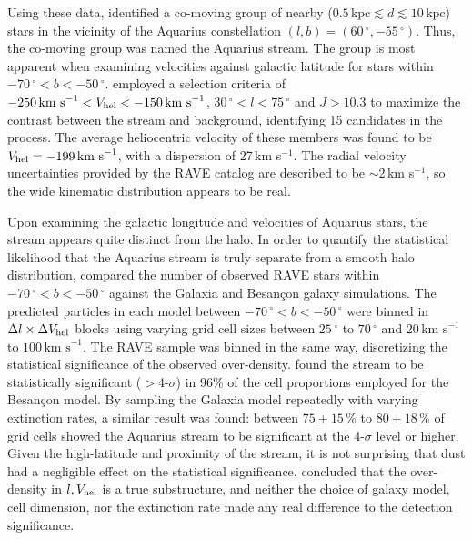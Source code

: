 \documentclass{emulateapj}
\begin{document}
Using these data, \citet{williams;et-al_2011} identified a co-moving group of nearby ($0.5\,\mbox{kpc} \lesssim d \lesssim 10\,\mbox{kpc}$) stars in the vicinity of the Aquarius constellation $(l, b) = (60\,^\circ, -55\,^\circ)$. Thus, the co-moving group was named the Aquarius stream. The group is most apparent when examining velocities against galactic latitude for stars within $-70\,^\circ < b < -50\,^\circ$. \citet{williams;et-al_2011} employed a selection criteria of $-250\,\mbox{km s}^{-1} < V_{\rm hel} < -150\,\mbox{km s}^{-1}$, $30\,^\circ < l < 75\,^\circ$ and $J > 10.3$ to maximize the contrast between the stream and background, identifying 15 candidates in the process. The average heliocentric velocity of these members was found to be $V_{\rm hel} = -199\,\mbox{km s}^{-1}$, with a dispersion of 27\,km s$^{-1}$. The radial velocity uncertainties provided by the RAVE catalog are described to be $\sim$2\,km s$^{-1}$, so the wide kinematic distribution appears to be real.

Upon examining the galactic longitude and velocities of Aquarius stars, the stream appears quite distinct from the halo. In order to quantify the statistical likelihood that the Aquarius stream is truly separate from a smooth halo distribution, \citet{williams;et-al_2011} compared the number of observed RAVE stars within $-70\,^\circ < b < -50\,^\circ$ against the Galaxia \citep{sharma;et-al_2011} and Besan\c{c}on \citep{robin;et-al_2003} galaxy simulations. The predicted particles in each model between $-70\,^\circ < b < -50\,^\circ$ were binned in $\Delta{l} \times \Delta{V_{\rm hel}}$ blocks using varying grid cell sizes between $25\,^\circ$ to $70\,^\circ$ and $20\,\mbox{km s}^{-1}$ to $100\,\mbox{km s}^{-1}$. The RAVE sample was binned in the same way, discretizing the statistical significance of the observed over-density. \citet{williams;et-al_2011} found the stream to be statistically significant ($>$4-$\sigma$) in 96\% of the cell proportions employed for the Besan\c{c}on model. By sampling the Galaxia model repeatedly with varying extinction rates, a similar result was found: between $75\pm15$\,\% to $80\pm18$\,\% of grid cells showed the Aquarius stream to be significant at the 4-$\sigma$ level or higher. Given the high-latitude and proximity of the stream, it is not surprising that dust had a negligible effect on the statistical significance. \citet{williams;et-al_2011} concluded that the over-density in $l, V_{\rm hel}$ is a true substructure, and neither the choice of galaxy model, cell dimension, nor the extinction rate made any real difference to the detection significance.
\end{document}
